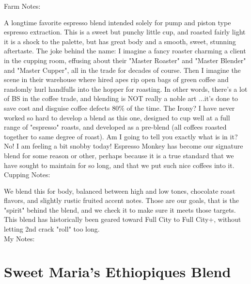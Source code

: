 \documentclass[10pt,twoside,footinclude=true,headinclude=true]{scrbook} %
\newlength{\mysize}
\newcommand{\myfontsize}[1]{
  \setlength{\mysize}{#1pt}
  \fontsize{\mysize}{1.2\mysize}
  \selectfont
}
\begin{document}

\newpage
\vspace*{-2.2em}
\raggedright
\normalsize
Farm Notes: \\
\myfontsize{8}
A longtime favorite espresso blend intended solely for pump and piston type espresso extraction. This is a sweet but punchy little cup, and roasted fairly light it is a shock to the palette, but has great body and a smooth, sweet, stunning aftertaste. The joke behind the name: I imagine a fancy roaster charming a client in the cupping room, effusing about their "Master Roaster" and "Master Blender" and "Master Cupper", all in the trade for decades of course. Then I imagine the scene in their warehouse where hired apes rip open bags of green coffee and randomly hurl handfulls into the hopper for roasting. In other words, there's a lot of BS in the coffee trade, and blending is NOT really a noble art ...it's done to save cost and disguise coffee defects 80\% of the time. The Irony? I have never worked so hard to develop a blend as this one, designed to cup well at a full range of "espresso" roasts, and developed as a pre-blend (all coffees roasted together to same degree of roast). Am I going to tell you exactly what is in it? No! I am feeling a bit snobby today! Espresso Monkey has become our signature blend for some reason or other, perhaps because it is a true standard that we have sought to maintain for so long, and that we put such nice coffees into it. \\
\medskip
\normalsize
Cupping Notes: \\
\myfontsize{8}
We blend this for body, balanced between high and low tones, chocolate roast flavors, and slightly rustic fruited accent notes. Those are our goals, that is the "spirit" behind the blend, and we check it to make sure it meets those targets. This blend has historically been geared toward Full City to Full City+, without letting 2nd crack "roll" too long.  \\
\medskip
\normalsize
My Notes:


\chapter*{Sweet Maria's Ethiopiques Blend}
 
\end{document}
